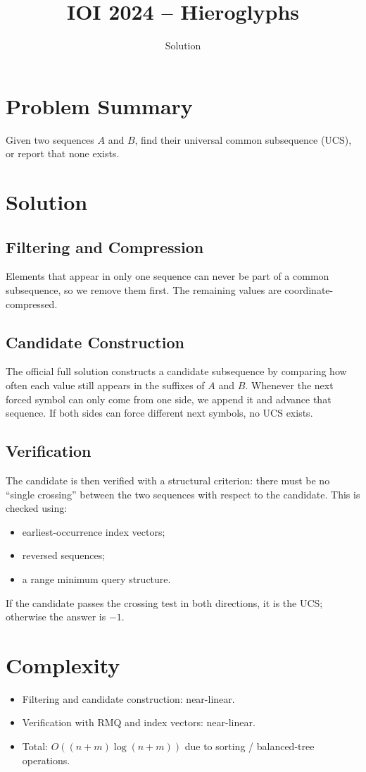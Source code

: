 \documentclass[11pt,a4paper]{article}
\title{IOI 2024 -- Hieroglyphs}
\author{Solution}
\date{}
\begin{document}
\maketitle

\section{Problem Summary}
Given two sequences $A$ and $B$, find their universal common subsequence (UCS), or report that none exists.

\section{Solution}

\subsection{Filtering and Compression}
Elements that appear in only one sequence can never be part of a common subsequence, so we remove them first. The remaining values are coordinate-compressed.

\subsection{Candidate Construction}
The official full solution constructs a candidate subsequence by comparing how often each value still appears in the suffixes of $A$ and $B$. Whenever the next forced symbol can only come from one side, we append it and advance that sequence. If both sides can force different next symbols, no UCS exists.

\subsection{Verification}
The candidate is then verified with a structural criterion: there must be no ``single crossing'' between the two sequences with respect to the candidate. This is checked using:
\begin{itemize}
  \item earliest-occurrence index vectors;
  \item reversed sequences;
  \item a range minimum query structure.
\end{itemize}
If the candidate passes the crossing test in both directions, it is the UCS; otherwise the answer is $-1$.

\section{Complexity}
\begin{itemize}
  \item Filtering and candidate construction: near-linear.
  \item Verification with RMQ and index vectors: near-linear.
  \item Total: $O((n+m)\log(n+m))$ due to sorting / balanced-tree operations.
\end{itemize}
\end{document}
